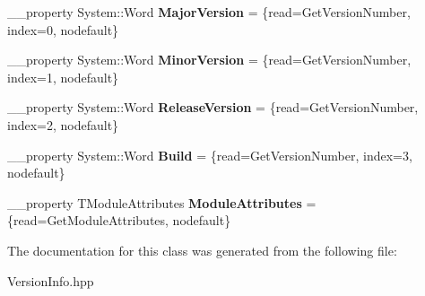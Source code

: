 \begin{DoxyCompactItemize}
\item 
\hypertarget{class_versioninfo_1_1_t_version_info_a6311481bf828cb4497ef08b271b83ecf}{\+\_\+\+\_\+property System\+::\+Word {\bfseries Major\+Version} = \{read=Get\+Version\+Number, index=0, nodefault\}}\label{class_versioninfo_1_1_t_version_info_a6311481bf828cb4497ef08b271b83ecf}

\item 
\hypertarget{class_versioninfo_1_1_t_version_info_a6b7bcded27f8221dd556251c06037368}{\+\_\+\+\_\+property System\+::\+Word {\bfseries Minor\+Version} = \{read=Get\+Version\+Number, index=1, nodefault\}}\label{class_versioninfo_1_1_t_version_info_a6b7bcded27f8221dd556251c06037368}

\item 
\hypertarget{class_versioninfo_1_1_t_version_info_a11ab79bfe5e382e4d2925aedafe043a7}{\+\_\+\+\_\+property System\+::\+Word {\bfseries Release\+Version} = \{read=Get\+Version\+Number, index=2, nodefault\}}\label{class_versioninfo_1_1_t_version_info_a11ab79bfe5e382e4d2925aedafe043a7}

\item 
\hypertarget{class_versioninfo_1_1_t_version_info_a19e46f953e786d471c2915eb6f48d80a}{\+\_\+\+\_\+property System\+::\+Word {\bfseries Build} = \{read=Get\+Version\+Number, index=3, nodefault\}}\label{class_versioninfo_1_1_t_version_info_a19e46f953e786d471c2915eb6f48d80a}

\item 
\hypertarget{class_versioninfo_1_1_t_version_info_a8e61b9f4975d0cc307d20392c2a6ef51}{\+\_\+\+\_\+property T\+Module\+Attributes {\bfseries Module\+Attributes} = \{read=Get\+Module\+Attributes, nodefault\}}\label{class_versioninfo_1_1_t_version_info_a8e61b9f4975d0cc307d20392c2a6ef51}

\end{DoxyCompactItemize}


The documentation for this class was generated from the following file\+:\begin{DoxyCompactItemize}
\item 
Version\+Info.\+hpp\end{DoxyCompactItemize}
